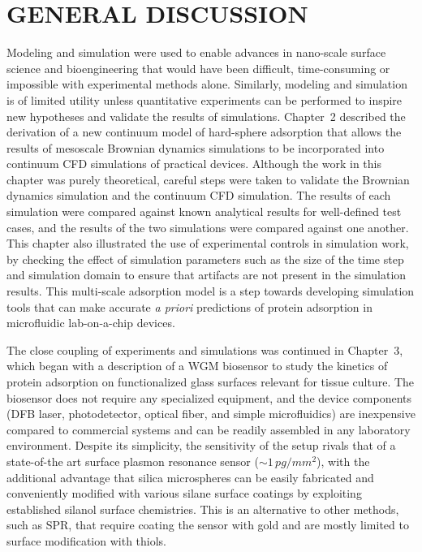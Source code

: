 
\chapter{GENERAL DISCUSSION}

Modeling and simulation were used to enable advances in nano-scale
surface science and bioengineering that would have been difficult,
time-consuming or impossible with experimental methods alone. Similarly,
modeling and simulation is of limited utility unless quantitative
experiments can be performed to inspire new hypotheses and validate
the results of simulations. Chapter~2 described the derivation of
a new continuum model of hard-sphere adsorption that allows the results
of mesoscale Brownian dynamics simulations to be incorporated into
continuum CFD simulations of practical devices. Although the work
in this chapter was purely theoretical, careful steps were taken to
validate the Brownian dynamics simulation and the continuum CFD simulation.
The results of each simulation were compared against known analytical
results for well-defined test cases, and the results of the two simulations
were compared against one another. This chapter also illustrated the
use of experimental controls in simulation work, by checking the effect
of simulation parameters such as the size of the time step and simulation
domain to ensure that artifacts are not present in the simulation
results. This multi-scale adsorption model is a step towards developing
simulation tools that can make accurate \emph{a priori }predictions
of protein adsorption in microfluidic lab-on-a-chip devices.

The close coupling of experiments and simulations was continued in
Chapter~3, which began with a description of a WGM biosensor to study
the kinetics of protein adsorption on functionalized glass surfaces
relevant for tissue culture. The biosensor does not require any specialized
equipment, and the device components (DFB laser, photodetector, optical
fiber, and simple microfluidics) are inexpensive compared to commercial
systems and can be readily assembled in any laboratory environment.
Despite its simplicity, the sensitivity of the setup rivals that of
a state-of-the art surface plasmon resonance sensor ($\sim1\, pg/mm^{2}$),
with the additional advantage that silica microspheres can be easily
fabricated and conveniently modified with various silane surface coatings
by exploiting established silanol surface chemistries. This is an
alternative to other methods, such as SPR, that require coating the
sensor with gold and are mostly limited to surface modification with
thiols. 

